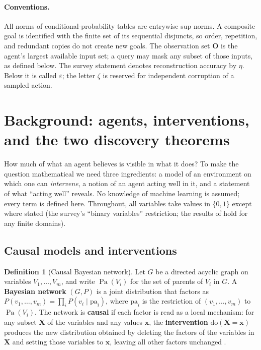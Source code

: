 \documentclass[11pt]{amsart}
\theoremstyle{plain}
\theoremstyle{definition}
\newtheorem{definition}[theorem]{Definition}
\DeclareMathOperator{\Pa}{Pa}
\newcommand{\bO}{\mathbf{O}}
\begin{document}
\paragraph{Conventions.}
All norms of conditional-probability tables are entrywise sup norms. A composite goal is identified with the finite set of its sequential disjuncts, so order, repetition, and redundant copies do not create new goals. The observation set $\bO$ is the agent's largest available input set; a query may mask any subset of those inputs, as defined below.
The survey statement denotes reconstruction accuracy by $\eta$. Below it is called $\varepsilon$; the letter $\zeta$ is reserved for independent corruption of a sampled action.

\section{Background: agents, interventions, and the two discovery theorems}\label{sec:background}

How much of what an agent believes is visible in what it does? To make the question mathematical we need three ingredients: a model of an environment on which one can \emph{intervene}, a notion of an agent acting well in it, and a statement of what ``acting well'' reveals. No knowledge of machine learning is assumed; every term is defined here. Throughout, all variables take values in $\{0,1\}$ except where stated (the survey's ``binary variables'' restriction; the results of \cite{richens2024} hold for any finite domains).

\subsection{Causal models and interventions}\label{subsec:causal}

\begin{definition}[Causal Bayesian network]\label{def:cbn}
Let $G$ be a directed acyclic graph on variables $V_1,\dots,V_m$, and write $\Pa(V_i)$ for the set of parents of $V_i$ in $G$. A \textbf{Bayesian network} $(G,P)$ is a joint distribution that factors as $P(v_1,\dots,v_m)=\prod_i P(v_i\mid \mathrm{pa}_i)$, where $\mathrm{pa}_i$ is the restriction of $(v_1,\dots,v_m)$ to $\Pa(V_i)$. The network is \textbf{causal} if each factor is read as a local mechanism: for any subset $\mathbf{X}$ of the variables and any values $\mathbf{x}$, the \textbf{intervention} $\mathrm{do}(\mathbf{X}=\mathbf{x})$ produces the new distribution obtained by deleting the factors of the variables in $\mathbf{X}$ and setting those variables to $\mathbf{x}$, leaving all other factors unchanged \cite{pearl2009}.
\end{definition}
\end{document}

